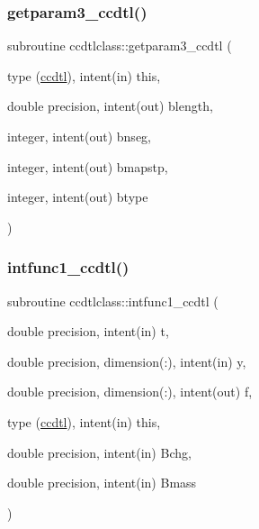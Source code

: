 \mbox{\label{namespaceccdtlclass_a529631343d4306c6c486d72e2a6696a3}} 
\subsubsection{\texorpdfstring{getparam3\_ccdtl()}{getparam3\_ccdtl()}}
{\footnotesize\ttfamily subroutine ccdtlclass\+::getparam3\+\_\+ccdtl (\begin{DoxyParamCaption}\item[{type (\mbox{\hyperlink{namespaceccdtlclass_structccdtlclass_1_1ccdtl}{ccdtl}}), intent(in)}]{this,  }\item[{double precision, intent(out)}]{blength,  }\item[{integer, intent(out)}]{bnseg,  }\item[{integer, intent(out)}]{bmapstp,  }\item[{integer, intent(out)}]{btype }\end{DoxyParamCaption})}

\mbox{\label{namespaceccdtlclass_afad7c4471295ba39993a4a180d6a4d54}} 
\subsubsection{\texorpdfstring{intfunc1\_ccdtl()}{intfunc1\_ccdtl()}}
{\footnotesize\ttfamily subroutine ccdtlclass\+::intfunc1\+\_\+ccdtl (\begin{DoxyParamCaption}\item[{double precision, intent(in)}]{t,  }\item[{double precision, dimension(\+:), intent(in)}]{y,  }\item[{double precision, dimension(\+:), intent(out)}]{f,  }\item[{type (\mbox{\hyperlink{namespaceccdtlclass_structccdtlclass_1_1ccdtl}{ccdtl}}), intent(in)}]{this,  }\item[{double precision, intent(in)}]{Bchg,  }\item[{double precision, intent(in)}]{Bmass }\end{DoxyParamCaption})}

